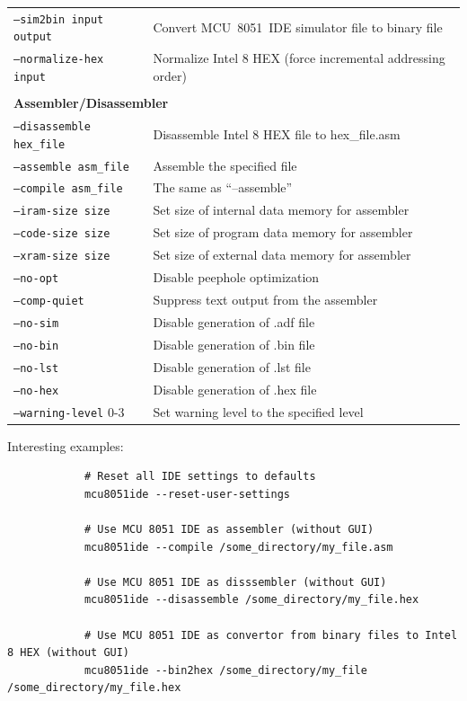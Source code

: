 \documentclass[a4paper,twoside,12pt]{book}
\newcommand{\mysmallfont}{\fontsize{8pt}{10pt} \selectfont{}}
\begin{document}
{\begin{longtable}{ll}
		\texttt{--sim2bin input output}	& Convert MCU~8051~IDE simulator file to binary file		\\
		\texttt{--normalize-hex input}	& Normalize Intel 8 HEX (force incremental addressing order)	\\
			\\\multicolumn{2}{l}{\textbf{Assembler/Disassembler}}					\\\hline
		\texttt{--disassemble hex\_file}& Disassemble Intel 8 HEX file to hex\_file.asm			\\
		\texttt{--assemble asm\_file}	& Assemble the specified file					\\
		\texttt{--compile asm\_file}	& The same as ``--assemble''					\\
		\texttt{--iram-size size}	& Set size of internal data memory for assembler		\\
		\texttt{--code-size size}	& Set size of program data memory for assembler			\\
		\texttt{--xram-size size}	& Set size of external data memory for assembler		\\
		\texttt{--no-opt}		& Disable peephole optimization					\\
		\texttt{--comp-quiet}		& Suppress text output from the assembler			\\
		\texttt{--no-sim}		& Disable generation of .adf file				\\
		\texttt{--no-bin}		& Disable generation of .bin file				\\
		\texttt{--no-lst}		& Disable generation of .lst file				\\
		\texttt{--no-hex}		& Disable generation of .hex file				\\
		\texttt{--warning-level} 0-3	& Set warning level to the specified level			\\
	\end{longtable}
	}

	\noindent
	Interesting examples:
	{
		\mysmallfont{}
		\begin{verbatim}
			# Reset all IDE settings to defaults
			mcu8051ide --reset-user-settings

			# Use MCU 8051 IDE as assembler (without GUI)
			mcu8051ide --compile /some_directory/my_file.asm

			# Use MCU 8051 IDE as disssembler (without GUI)
			mcu8051ide --disassemble /some_directory/my_file.hex

			# Use MCU 8051 IDE as convertor from binary files to Intel 8 HEX (without GUI)
			mcu8051ide --bin2hex /some_directory/my_file /some_directory/my_file.hex
		\end{verbatim}
	}
\end{document}
